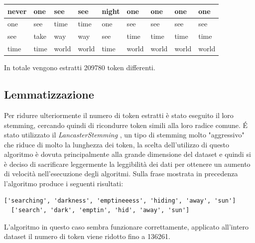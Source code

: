 \documentclass[technote]{IEEEtran}
\begin{document}
\begin{table}[H]
{\begin{tabular}{|l|l|l|l|l|l|l|l|l|}
never         & one                  & see                   & see                  & night               & one                        & one                  & one                 & one                  \\ \hline
one           & see                  & time                  & time                 & one                 & see                        & see                  & see                 & see                  \\ \hline
see           & take                 & way                   & way                  & see                 & time                       & time                 & time                & time                 \\ \hline
time          & time                 & world                 & world                & time                & world                      & world                & world               & world                \\ \hline
\end{tabular}
}
\label{t_10_word}
\end{table}
In totale vengono estratti 209780 token differenti.
\subsection{Lemmatizzazione}
Per ridurre ulteriormente il numero di token estratti \`e stato
eseguito il loro stemming, cercando quindi di ricondurre token
simili alla loro radice comune. \'E stato utilizzato il
\textit{LancasterStemming} \cite{10.1145/101306.101310}, un tipo di stemming
molto "aggressivo" che riduce di molto la lunghezza dei token,
la scelta dell'utilizzo di questo algoritmo è dovuta principalmente alla
grande dimensione del dataset e quindi si è deciso di sacrificare leggermente la
leggibilità dei dati per ottenere un aumento di velocità nell'esecuzione degli
algoritmi. Sulla frase mostrata in precedenza l'algoritmo produce i seguenti risultati:
\begin{lstlisting}[basicstyle=\tiny]
  ['searching', 'darkness', 'emptineeess', 'hiding', 'away', 'sun']
  ['search', 'dark', 'emptin', 'hid', 'away', 'sun']
\end{lstlisting}
L'algoritmo in questo caso sembra funzionare correttamente, applicato all'intero dataset il numero di token viene ridotto fino a 136261.
\end{document}
